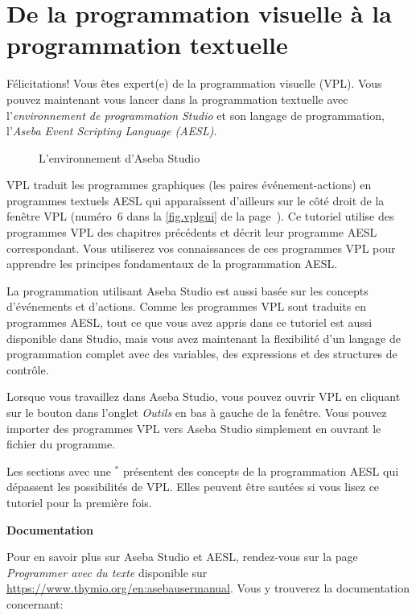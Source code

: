\part{De la programmation visuelle à la programmation textuelle}
\label{ch.next}

Félicitations!
Vous êtes expert(e) de la programmation visuelle (VPL).
Vous pouvez maintenant vous lancer dans la programmation textuelle
avec l'\textit{environnement de programmation Studio} et son langage de
programmation, l'\textit{Aseba Event Scripting Language (AESL)}.


\begin{figure}[hbt]
\begin{center}
\caption{L'environnement d'Aseba Studio}\label{fig.studio}
\end{center}
\end{figure}

VPL traduit les programmes graphiques (les paires événement-actions) en programmes textuels AESL
qui apparaîssent d'ailleurs sur le côté droit de la fenêtre VPL (numéro~6 dans la \cref{fig.vplgui}
de la page~\pageref{fig.vplgui}).
Ce tutoriel utilise des programmes VPL des chapitres précédents et décrit leur programme AESL correspondant.
Vous utiliserez vos connaissances de ces programmes VPL pour apprendre les principes fondamentaux 
de la programmation AESL.

La programmation utilisant Aseba Studio est aussi basée sur les concepts d'événements et d'actions.
Comme les programmes VPL sont traduits en programmes AESL,
tout ce que vous avez appris dans ce tutoriel est aussi disponible dans Studio,
mais vous avez maintenant la flexibilité d'un langage de programmation complet
avec des variables, des expressions et des structures de contrôle.

Lorsque vous travaillez dans Aseba Studio, vous pouvez ouvrir VPL en cliquant sur le bouton
 dans l'onglet \emph{Outils} en bas à gauche de la fenêtre.
Vous pouvez importer des programmes VPL vers Aseba Studio simplement en ouvrant le fichier du programme.

Les sections avec une $^*$ présentent des concepts de la programmation AESL qui dépassent les 
possibilités de VPL.
Elles peuvent être sautées si vous lisez ce tutoriel pour la première fois.

\newpage

\textbf{\large Documentation}

Pour en savoir plus sur Aseba Studio et AESL, rendez-vous sur la page \emph{Programmer avec du texte}
disponible sur \href{https://www.thymio.org/en:asebausermanual}{https://www.thymio.org/en:asebausermanual}.
Vous y trouverez la documentation concernant:

